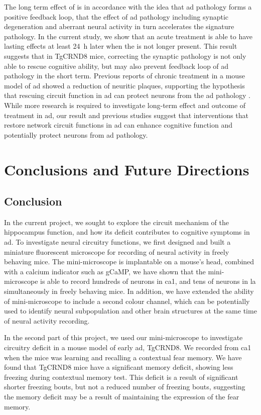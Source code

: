 The long term effect of \tglu{} is in accordance with the idea that \gls{ad} pathology forms a positive feedback loop, that the effect of \gls{ad} pathology including synaptic degeneration and aberrant neural activity in turn accelerates the signature pathology. In the current study, we show that an acute \tglu{} treatment is able to have lasting effects at least \SI{24}{\hour} later when the \tglu{} is not longer present. This result suggests that in TgCRND8 mice, correcting the synaptic pathology is not only able to rescue cognitive ability, but may also prevent feedback loop of \gls{ad} pathology in the short term. Previous reports of chronic \tglu{} treatment in a mouse model of \gls{ad} showed a reduction of neuritic plaques, supporting the hypothesis that rescuing circuit function in \gls{ad} can protect neurons from the \gls{ad} pathology \citep{dong15}. While more research is required to investigate long-term effect and outcome of \tglu{} treatment in \gls{ad}, our result and previous studies \citep{roy16, migues16, dong15} suggest that interventions that restore network circuit functions in \gls{ad} can enhance cognitive function and potentially protect neurons from \gls{ad} pathology. 

\chapter{Conclusions and Future Directions}

\section{Conclusion}

In the current project, we sought to explore the circuit mechanism of the hippocampus function, and how its deficit contributes to cognitive symptoms in \gls{ad}. To investigate neural circuitry functions, we first designed and built a miniature fluorescent microscope for recording of neural activity in freely behaving mice. The mini-microscope is implantable on a mouse's head, combined with a calcium indicator such as gCaMP, we have shown that the mini-microscope is able to record hundreds of neurons in \gls{ca1}, and tens of neurons in \gls{la} simultaneously in freely behaving mice. In addition, we have extended the ability of mini-microscope to include a second colour channel, which can be potentially used to identify neural subpopulation and other brain structures at the same time of neural activity recording.

In the second part of this project, we used our mini-microscope to investigate circuitry deficit in a mouse model of early \gls{ad}, TgCRND8. We recorded from \gls{ca1} when the mice was learning and recalling a contextual fear memory. We have found that TgCRND8 mice have a significant memory deficit, showing less freezing during contextual memory test. This deficit is a result of significant shorter freezing bouts, but not a reduced number of freezing bouts, suggesting the memory deficit may be a result of maintaining the expression of the fear memory.

